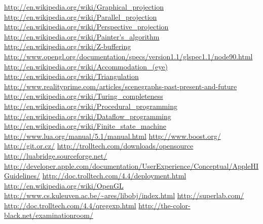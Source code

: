 \begin{thebibliography}{12}
 \url{http://en.wikipedia.org/wiki/Graphical_projection}
 \url{http://en.wikipedia.org/wiki/Parallel_projection}
 \url{http://en.wikipedia.org/wiki/Perspective_projection}
 \url{http://en.wikipedia.org/wiki/Painter's_algorithm}
 \url{http://en.wikipedia.org/wiki/Z-buffering}
 \url{http://www.opengl.org/documentation/specs/version1.1/glspec1.1/node90.html}
 \url{http://en.wikipedia.org/wiki/Accommodation_(eye)}
 \url{http://en.wikipedia.org/wiki/Triangulation}
 \url{http://www.realityprime.com/articles/scenegraphs-past-present-and-future}
 \url{http://en.wikipedia.org/wiki/Turing_completeness}
 \url{http://en.wikipedia.org/wiki/Procedural_programming}
 \url{http://en.wikipedia.org/wiki/Dataflow_programming}
 \url{http://en.wikipedia.org/wiki/Finite_state_machine}
 \url{http://www.lua.org/manual/5.1/manual.html}
 \url{http://www.boost.org/}
 \url{http://git.or.cz/}
 \url{http://trolltech.com/downloads/opensource}
 \url{http://luabridge.sourceforge.net/}
 \url{http://developer.apple.com/documentation/UserExperience/Conceptual/AppleHIGuidelines/}
 \url{http://doc.trolltech.com/4.4/deployment.html}
 \url{http://en.wikipedia.org/wiki/OpenGL}
 \url{http://www.cs.kuleuven.ac.be/~ares/libobj/index.html}
 \url{http://superlab.com/}
 \url{http://doc.trolltech.com/4.4/qregexp.html}
 \url{http://the-color-black.net/examinationroom/}
\end{thebibliography}

